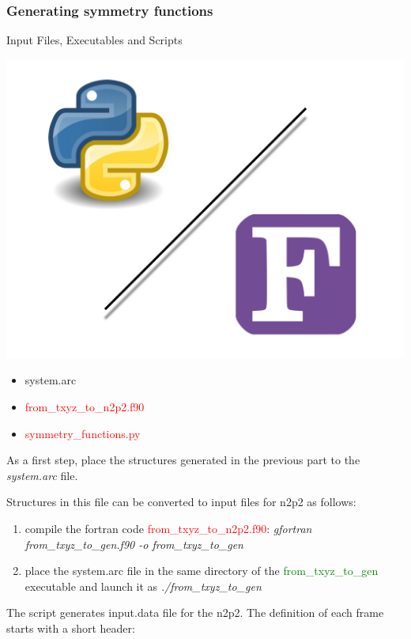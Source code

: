 \documentclass[12pt]{article}
\begin{document}
\subsubsection{Generating symmetry functions}
\begin{mybox2}{{Input Files, Executables and Scripts}}
\begin{minipage}[c]{0.5\linewidth}
\includegraphics[scale=0.1]{Python-fortran.jpeg}
\end{minipage}
\begin{minipage}[c]{0.5\linewidth}
\begin{itemize}
    \item system.arc
    \item \textcolor{red}{from\_txyz\_to\_n2p2.f90}
    \item \textcolor{red}{symmetry\_functions.py}
\end{itemize}
\end{minipage}
\end{mybox2}

As a first step, place the structures generated in the previous part to the \textit{system.arc} file. 

Structures in this file can be converted to input files for n2p2 as follows:

\begin{enumerate}
    \item compile the fortran code \textcolor{red}{from\_txyz\_to\_n2p2.f90}:
    \textit{gfortran from\_txyz\_to\_gen.f90 -o from\_txyz\_to\_gen} 
    \item place the system.arc file in the same directory of the \textcolor{green}{from\_txyz\_to\_gen} executable and launch it as \textit{./from\_txyz\_to\_gen}
\end{enumerate}
The script generates input.data file for the n2p2. The definition of each frame starts with a short header:
\vspace{0.5cm}
\end{document}
